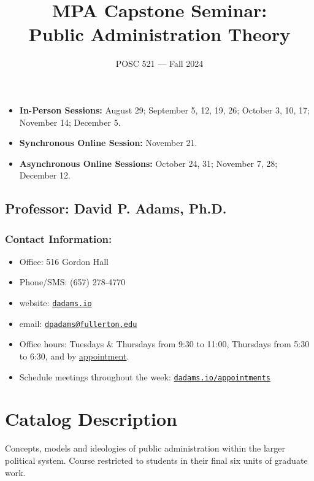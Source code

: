\documentclass[12pt, letterpaper]{article}
\begin{document}
\title{MPA Capstone Seminar: \\ Public Administration Theory}
\author{POSC 521 — Fall 2024}
\date{}
    \maketitle

    
\begin{itemize}
    \item \textbf{In-Person Sessions:} August 29; September 5, 12, 19, 26; October 3, 10, 17; November 14; December 5.
    \item \textbf{Synchronous Online Session:} November 21.
    \item \textbf{Asynchronous Online Sessions:} October 24, 31; November 7, 28; December 12.
\end{itemize}

    \subsection*{Professor: David P. Adams, Ph.D.}

    \subsubsection*{Contact Information:}
    
    \begin{itemize}
        \item Office: 516 Gordon Hall
        \item Phone/SMS: (657) 278-4770
        \item website: \href{https://dadams.io}{\texttt{dadams.io}}
        \item email: \href{dpadams@fullerton.edu}{\texttt{dpadams@fullerton.edu}}
        \item Office hours: Tuesdays \& Thursdays from 9:30 to 11:00, Thursdays from 5:30 to 6:30, and by \href{https://dadams.io/appointments}{appointment}.
        \item Schedule meetings throughout the week: \href{https://dadams.io/appointments}{\texttt{dadams.io/appointments}}
    \end{itemize}
    
    \section{Catalog Description}
    Concepts, models and ideologies of public administration within the larger political system. Course restricted to students in their final six units of graduate work.
    
\end{document}
